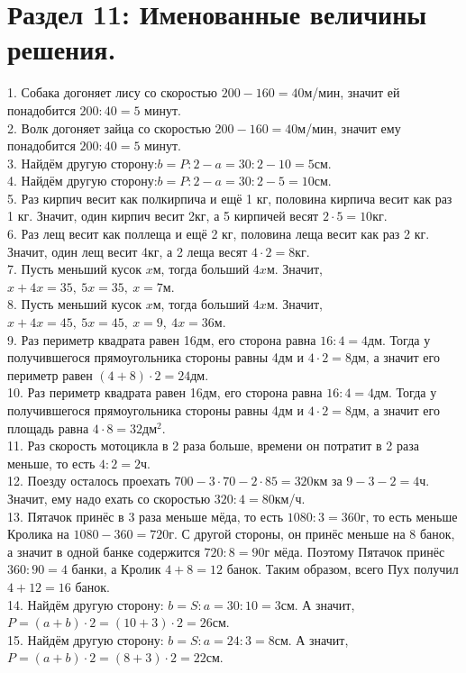 \section{Раздел 11: Именованные величины решения.}
1. Собака догоняет лису со скоростью $200-160=40$м/мин, значит ей понадобится $200:40=5$ минут.\\
2. Волк догоняет зайца со скоростью $200-160=40$м/мин, значит ему понадобится $200:40=5$ минут.\\
3. Найдём другую сторону:$b=P:2-a=30:2-10=5$см.\\
4. Найдём другую сторону:$b=P:2-a=30:2-5=10$см.\\
5. Раз кирпич весит как полкирпича и ещё 1 кг, половина кирпича весит как раз 1 кг. Значит, один кирпич весит 2кг, а 5 кирпичей весят $2\cdot5=10$кг.\\
6. Раз лещ весит как поллеща и ещё 2 кг, половина леща весит как раз 2 кг. Значит, один лещ весит 4кг, а 2 леща весят $4\cdot2=8$кг.\\
7. Пусть меньший кусок $x$м, тогда больший $4x$м. Значит, $x+4x=35,\ 5x=35,\ x=7$м.\\
8. Пусть меньший кусок $x$м, тогда больший $4x$м. Значит, $x+4x=45,\ 5x=45,\ x=9,\ 4x=36$м.\\
9. Раз периметр квадрата равен 16дм, его сторона равна $16:4=4$дм. Тогда у получившегося прямоугольника стороны равны 4дм и $4\cdot2=8$дм, а значит его периметр
равен $(4+8)\cdot2=24$дм.\\
10. Раз периметр квадрата равен 16дм, его сторона равна $16:4=4$дм. Тогда у получившегося прямоугольника стороны равны 4дм и $4\cdot2=8$дм, а значит его
площадь равна $4\cdot8=32\text{дм}^2.$\\
11. Раз скорость мотоцикла в 2 раза больше, времени он потратит в 2 раза меньше, то есть $4:2=2$ч.\\
12. Поезду осталось проехать $700-3\cdot70-2\cdot85=320$км за $9-3-2=4$ч. Значит, ему надо ехать со скоростью $320:4=80$км/ч.\\
13. Пятачок принёс в 3 раза меньше мёда, то есть $1080:3=360$г, то есть меньше Кролика на $1080-360=720$г. С другой стороны, он принёс меньше на 8 банок, а значит в одной банке содержится $720:8=90$г мёда. Поэтому Пятачок принёс $360:90=4$ банки, а Кролик $4+8=12$ банок. Таким образом, всего Пух получил $4+12=16$ банок.\\
14. Найдём другую сторону: $b=S:a=30:10=3$см. А значит, $P=(a+b)\cdot2=(10+3)\cdot2=26$см.\\
15. Найдём другую сторону: $b=S:a=24:3=8$см. А значит, $P=(a+b)\cdot2=(8+3)\cdot2=22$см.\\
